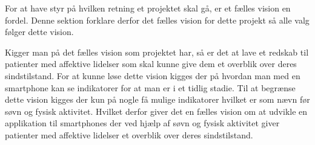 For at have styr på hvilken retning et projektet skal gå, er et fælles vision en fordel.
Denne sektion forklare derfor det fælles vision for dette projekt så alle valg følger dette vision.

Kigger man på det fælles vision som projektet har, så er det at lave et redskab til patienter med affektive lidelser som skal kunne give dem et overblik over deres sindstilstand.
For at kunne løse dette vision kigges der på hvordan man med en smartphone kan se indikatorer for at man er i et tidlig stadie.
Til at begrænse dette vision kigges der kun på nogle få mulige indikatorer hvilket er som nævn før søvn og fysisk aktivitet.
Hvilket derfor giver det en fælles vision om at udvikle en applikation til smartphones der ved hjælp af søvn og fysisk aktivitet giver patienter med affektive lidelser et overblik over deres sindstilstand.